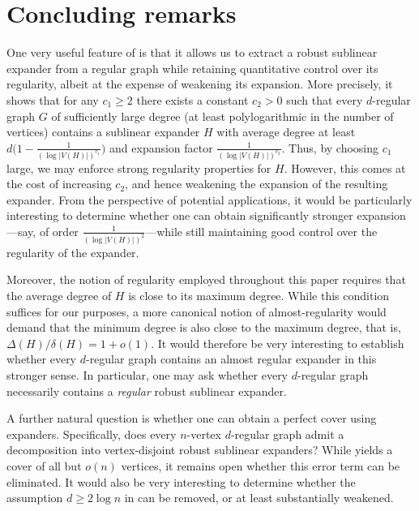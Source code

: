 \documentclass[10pt]{article}
\theoremstyle{plain}
\numberwithin{theorem}{section}
\theoremstyle{definition}
\theoremstyle{remark}
\theoremstyle{plain}
\begin{document}
\section{Concluding remarks}

One very useful feature of  is that it allows us to extract a robust sublinear expander from a regular graph while retaining quantitative control over its regularity, albeit at the expense of weakening its expansion. More precisely, it shows that for any $c_1 \ge 2$ there exists a constant $c_2>0$ such that every $d$-regular graph $G$ of sufficiently large degree (at least polylogarithmic in the number of vertices) contains a sublinear expander $H$ with average degree at least $d\bigl(1-\frac{1}{(\log |V(H)|)^{c_1}}\bigr)$ and expansion factor $\frac{1}{(\log |V(H)|)^{c_2}}$. Thus, by choosing $c_1$ large, we may enforce strong regularity properties for $H$. However, this comes at the cost of increasing $c_2$, and hence weakening the expansion of the resulting expander. From the perspective of potential applications, it would be particularly interesting to determine whether one can obtain significantly stronger expansion—say, of order $\frac{1}{(\log |V(H)|)^{2}}$—while still maintaining good control over the regularity of the expander.

Moreover, the notion of regularity employed throughout this paper requires that the average degree of $H$ is close to its maximum degree. While this condition suffices for our purposes, a more canonical notion of almost-regularity would demand that the minimum degree is also close to the maximum degree, that is, $\Delta(H)/\delta(H)=1+o(1)$. It would therefore be very interesting to establish whether every $d$-regular graph contains an almost regular expander in this stronger sense. In particular, one may ask whether every $d$-regular graph necessarily contains a \emph{regular} robust sublinear expander.

A further natural question is whether one can obtain a perfect cover using expanders. Specifically, does every $n$-vertex $d$-regular graph admit a decomposition into vertex-disjoint robust sublinear expanders? While  yields a cover of all but $o(n)$ vertices, it remains open whether this error term can be eliminated. It would also be very interesting to determine whether the assumption $d \ge 2\log n$ in  can be removed, or at least substantially weakened.

\end{document}
